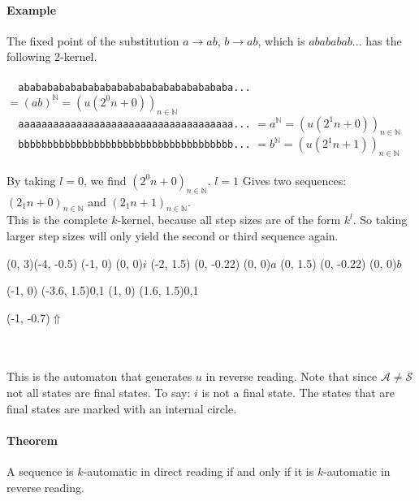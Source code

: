 \documentclass{article}
\begin{document}
\paragraph{Example}
The fixed point of the substitution $a \rightarrow ab$, $b \rightarrow ab$,
which is $abababab...$ has the following 2-kernel.\\
\\
\verb#  ababababababababababababababababababa...#
$= (ab)^\mathbb{N} = (u(2^0 n + 0))_{n \in \mathbb{N}}$\\
\verb#  aaaaaaaaaaaaaaaaaaaaaaaaaaaaaaaaaaaaa...#
$= a^\mathbb{N} = (u(2^1 n + 0))_{n \in \mathbb{N}}$\\
\verb#  bbbbbbbbbbbbbbbbbbbbbbbbbbbbbbbbbbbbb...#
$= b^\mathbb{N} = (u(2^1 n + 1))_{n \in \mathbb{N}}$\\
\\
By taking $l = 0$, we find $(2^0 n + 0)_{n \in \mathbb{N}}$. $l = 1$ Gives
two sequences: $(2_1 n + 0)_{n \in \mathbb{N}}$ and
$(2_1 n + 1)_{n \in \mathbb{N}}$.\\
This is the complete $k$-kernel, because all step sizes are of the form
$k^l$. So taking larger step sizes will only yield the second or third
sequence again.\\
\begin{graph}(0, 3)(-4, -0.5)
  (-1, 0) (0, 0){$i$}
  (-2, 1.5)
    (0, -0.22){} (0, 0){$a$}
  (0, 1.5)
    (0, -0.22){} (0, 0){$b$}

   
   
  (-1, 0) \freetext(-3.6, 1.5){0,1}
  (1, 0) \freetext(1.6, 1.5){0,1}

  \freetext(-1, -0.7){$\Uparrow$}
\end{graph}\\
\\
This is the automaton that generates $u$ in reverse reading. Note that since
$\mathcal{A \ne S}$ not all states are final states. To say: $i$ is not a
final state. The states that are final states are marked with an internal
circle.

\paragraph{Theorem} A sequence is $k$-automatic in direct reading if and only
if it is $k$-automatic in reverse reading.
\end{document}
